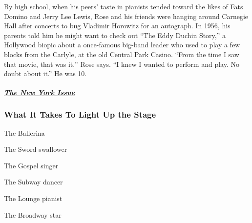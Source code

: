 By high school, when his peers' taste in pianists tended toward the
likes of Fats Domino and Jerry Lee Lewis, Rose and his friends were
hanging around Carnegie Hall after concerts to bug Vladimir Horowitz for
an autograph. In 1956, his parents told him he might want to check out
``The Eddy Duchin Story,'' a Hollywood biopic about a once-famous
big-band leader who used to play a few blocks from the Carlyle, at the
old Central Park Casino. ``From the time I saw that movie, that was
it,'' Rose says. ``I knew I wanted to perform and play. No doubt about
it.'' He was 10.

\hypertarget{the-new-york-issue}{%
\subparagraph{\texorpdfstring{\href{https://www.nytimes3xbfgragh.onion/interactive/2019/05/30/magazine/performers-new-york.html}{The
New York Issue}}{The New York Issue}}\label{the-new-york-issue}}

\hypertarget{what-it-takes-to-light-up-the-stage}{%
\subsubsection{What It Takes To Light Up the
Stage}\label{what-it-takes-to-light-up-the-stage}}

\href{https://www.nytimes3xbfgragh.onion/interactive/2019/05/30/magazine/dance-ballet-new-york.html}{}

The Ballerina

\href{https://www.nytimes3xbfgragh.onion/interactive/2019/05/30/magazine/sword-swallowing-new-york.html}{}

The Sword swallower

\href{https://www.nytimes3xbfgragh.onion/interactive/2019/05/30/magazine/gospel-singer-new-york.html}{}

The Gospel singer

\href{https://www.nytimes3xbfgragh.onion/interactive/2019/05/30/magazine/subway-dance-new-york.html}{}

The Subway dancer

\href{https://www.nytimes3xbfgragh.onion/interactive/2019/05/30/magazine/earl-rose-piano-carlyle-new-york.html}{}

The Lounge pianist

\href{https://www.nytimes3xbfgragh.onion/interactive/2019/05/30/magazine/broadway-kiss-me-kate.html}{}

The Broadway star

\href{https://www.nytimes3xbfgragh.onion/interactive/2019/05/30/magazine/latin-beat-new-york.html}{}

